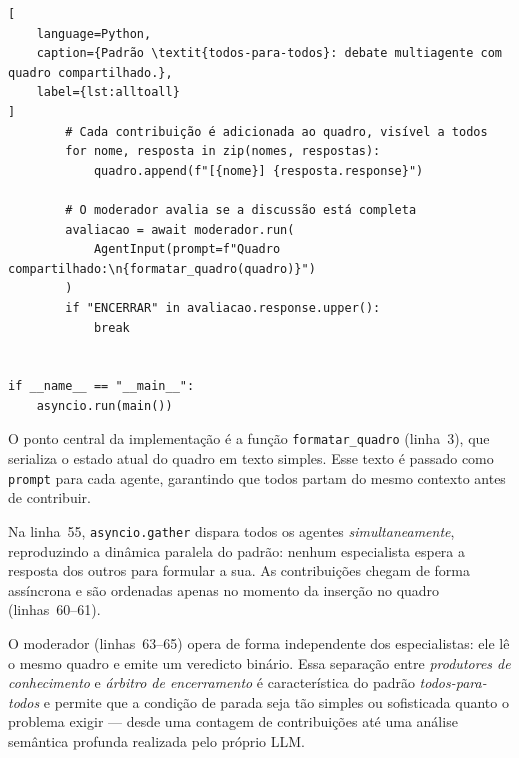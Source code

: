 \begin{lstlisting}[
    language=Python,
    caption={Padrão \textit{todos-para-todos}: debate multiagente com quadro compartilhado.},
    label={lst:alltoall}
]
        # Cada contribuição é adicionada ao quadro, visível a todos
        for nome, resposta in zip(nomes, respostas):
            quadro.append(f"[{nome}] {resposta.response}")

        # O moderador avalia se a discussão está completa
        avaliacao = await moderador.run(
            AgentInput(prompt=f"Quadro compartilhado:\n{formatar_quadro(quadro)}")
        )
        if "ENCERRAR" in avaliacao.response.upper():
            break


if __name__ == "__main__":
    asyncio.run(main())
\end{lstlisting}

O ponto central da implementação é a função \texttt{formatar\_quadro} (linha~3), que
serializa o estado atual do quadro em texto simples. Esse texto é passado como
\texttt{prompt} para cada agente, garantindo que todos partam do mesmo contexto antes
de contribuir.

Na linha~55, \texttt{asyncio.gather} dispara todos os agentes \emph{simultaneamente},
reproduzindo a dinâmica paralela do padrão: nenhum especialista espera a resposta dos
outros para formular a sua. As contribuições chegam de forma assíncrona e são
ordenadas apenas no momento da inserção no quadro (linhas~60--61).

O moderador (linhas~63--65) opera de forma independente dos especialistas: ele lê o
mesmo quadro e emite um veredicto binário. Essa separação entre \emph{produtores de
conhecimento} e \emph{árbitro de encerramento} é característica do padrão
\textit{todos-para-todos} e permite que a condição de parada seja tão simples ou
sofisticada quanto o problema exigir --- desde uma contagem de contribuições até uma
análise semântica profunda realizada pelo próprio LLM.
